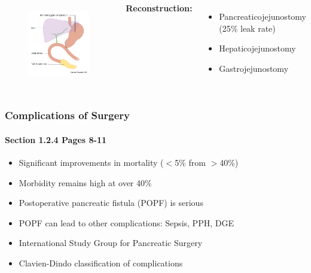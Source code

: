 \documentclass{beamer}
\begin{document}
\begin{frame}
\begin{columns}[t]
		
		\begin{figure}
			\centering
			\includegraphics[width=0.8\linewidth]{whipple_schematic_post}
			\label{fig:whipple_schematic_post}
		\end{figure}
		{\scriptsize
		\textbf{Reconstruction:}
		\begin{itemize}
			\item Pancreaticojejunostomy (25\% leak rate)
			\item Hepaticojejunostomy
			\item Gastrojejunostomy
		\end{itemize}
		}
	\end{columns}
\end{frame}

\begin{frame}
	\frametitle{Complications of Surgery}
	\framesubtitle{Section 1.2.4 Pages 8-11}
	\begin{itemize}
		\item Significant improvements in mortality ($<$5\% from $>$40\%)
		\item Morbidity remains high at over 40\%
		\item Postoperative pancreatic fistula (POPF) is serious
		\item POPF can lead to other complications: Sepsis, PPH, DGE
		\item International Study Group for Pancreatic Surgery
		\item Clavien-Dindo classification of complications
	\end{itemize}
\end{frame}
\end{document}
